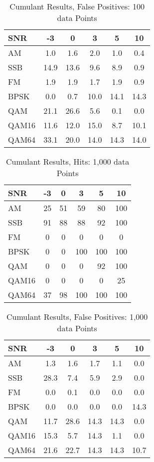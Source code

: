\begin{table}
\caption{Cumulant Results, False Positives: 100 data Points}
\centering
\begin{tabular}{ l | c | c | c | c | c } \hline
SNR &	 -3 &	 0 &	 3 &	 5 &	 10 \\ \hline \hline
AM &	 1.0 &	 1.6 &	 2.0 &	 1.0 &	 0.4 \\ \hline 
SSB &	 14.9 &	 13.6 &	 9.6 &	 8.9 &	 0.9 \\ \hline 
FM &	 1.9 &	 1.9 &	 1.7 &	 1.9 &	 0.9 \\ \hline 
BPSK &	 0.0 &	 0.7 &	 10.0 &	 14.1 &	 14.3 \\ \hline 
QAM &	 21.1 &	 26.6 &	 5.6 &	 0.1 &	 0.0 \\ \hline 
QAM16 &	 11.6 &	 12.0 &	 15.0 &	 8.7 &	 10.1 \\ \hline 
QAM64 &	 33.1 &	 20.0 &	 14.0 &	 14.3 &	 14.0 \\ \hline
\end{tabular}
\label{tab:cumFalsePositive100pt}
\end{table}


\begin{table}
\caption{Cumulant Results, Hits: 1,000 data Points}
\centering
\begin{tabular}{ l | c | c | c | c | c } \hline
SNR &	 -3 &	 0 &	 3 &	 5 &	 10\\ \hline \hline 
AM &	 25 &	 51 &	 59 &	 80 &	 100 \\ \hline 
 SSB &	 91 &	 88 &	 88 &	 92 &	 100 \\ \hline 
FM &	 0 &	 0 &	 0 &	 0 &	 0 \\ \hline 
BPSK &	 0 &	 0 &	 100 &	 100 &	 100 \\ \hline 
QAM &	 0 &	 0 &	 0 &	 92 &	 100 \\ \hline 
QAM16 &	 0 &	 0 &	 0 &	 0 &	 25 \\ \hline 
QAM64 &	 37 &	 98 &	 100 &	 100 &	 100 \\ \hline
\end{tabular}
\label{tab:cumHit1000pt}
\end{table}

\begin{table}
\caption{Cumulant Results, False Positives: 1,000 data Points}
\centering
\begin{tabular}{ l | c | c | c | c | c } \hline
SNR &	 -3 &	 0 &	 3 &	 5 &	 10 \\ \hline \hline 
AM &	 1.3 &	 1.6 &	 1.7 &	 1.1 &	 0.0 \\ \hline 
SSB &	 28.3 &	 7.4 &	 5.9 &	 2.9 &	 0.0 \\ \hline 
FM &	 0.0 &	 0.1 &	 0.0 &	 0.0 &	 0.0 \\ \hline 
BPSK &	 0.0 &	 0.0 &	 0.0 &	 0.0 &	 14.3 \\ \hline 
QAM &	 11.7 &	 28.6 &	 14.3 &	 14.3 &	 0.0 \\ \hline 
QAM16 &	 15.3 &	 5.7 &	 14.3 &	 1.1 &	 0.0 \\ \hline 
QAM64 &	 21.6 &	 22.7 &	 14.3 &	 14.3 &	 10.7 \\ \hline
\end{tabular}
\label{tab:cumFalsePositive1000pt}
\end{table}

